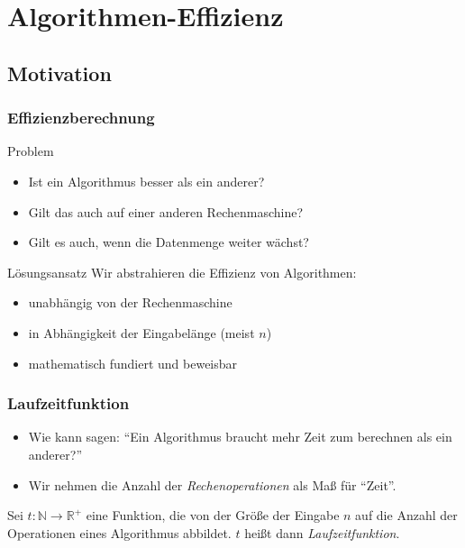 \section[Effizienz]{Algorithmen-Effizienz}
\subsection{Motivation}
\begin{frame}
  \frametitle{Effizienzberechnung}
  \begin{block}{Problem}
    \begin{itemize}
      \item Ist ein Algorithmus besser als ein anderer?
      \item Gilt das auch auf einer anderen Rechenmaschine?
      \item Gilt es auch, wenn die Datenmenge weiter wächst?
    \end{itemize}
  \end{block}
  \pause
  \begin{block}{Lösungsansatz}
    Wir abstrahieren die Effizienz von Algorithmen:
    \begin{itemize}
      \item unabhängig von der Rechenmaschine
      \item in Abhängigkeit der Eingabelänge (meist $n$)
      \item mathematisch fundiert und beweisbar
    \end{itemize}
  \end{block}
\end{frame}
\begin{frame}
  \frametitle{Laufzeitfunktion}
  \begin{itemize}
    \item Wie kann sagen: "`Ein Algorithmus braucht mehr Zeit zum berechnen als ein anderer?"'
    \item Wir nehmen die Anzahl der \emph{Rechenoperationen} als Maß für "`Zeit"'.
  \end{itemize}
  \pause
  \begin{definition}
    Sei $t: \mathbb{N} \longrightarrow \mathbb{R}^+$ eine Funktion, die von der Größe der Eingabe $n$ auf die Anzahl der Operationen eines Algorithmus abbildet.
    $t$ heißt dann \emph{Laufzeitfunktion}.
  \end{definition}
\end{frame}

